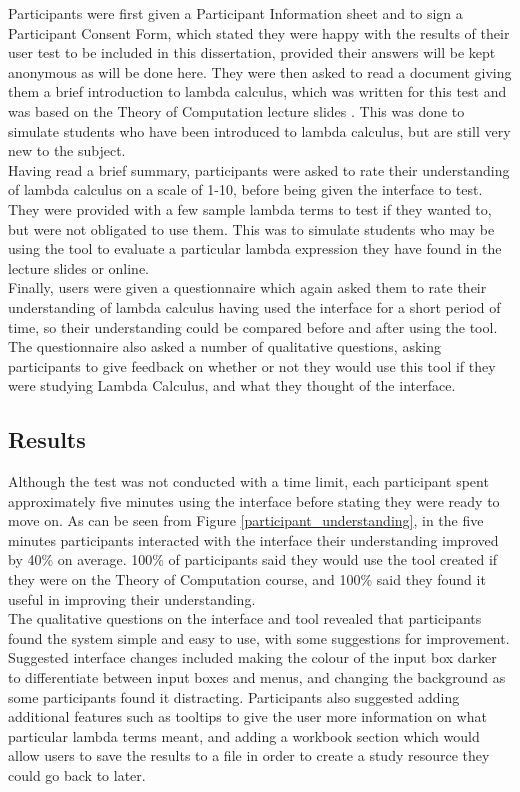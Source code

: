 \documentclass[a4paper,11pt]{report}
\begin{document}
Participants were first given a Participant Information sheet and to sign a Participant Consent Form, which stated they were happy with the results of their user test to be included in this dissertation, provided their answers will be kept anonymous as will be done here. They were then asked to read a document giving them a brief introduction to lambda calculus, which was written for this test and was based on the Theory of Computation lecture slides \cite{Gay2019}. This was done to simulate students who have been introduced to lambda calculus, but are still very new to the subject.\\

Having read a brief summary, participants were asked to rate their understanding of lambda calculus on a scale of 1-10, before being given the interface to test. They were provided with a few sample lambda terms to test if they wanted to, but were not obligated to use them. This was to simulate students who may be using the tool to evaluate a particular lambda expression they have found in the lecture slides or online.\\

Finally, users were given a questionnaire which again asked them to rate their understanding of lambda calculus having used the interface for a short period of time, so their understanding could be compared before and after using the tool. The questionnaire also asked a number of qualitative questions, asking participants to give feedback on whether or not they would use this tool if they were studying Lambda Calculus, and what they thought of the interface.

\subsection{Results}
Although the test was not conducted with a time limit, each participant spent approximately five minutes using the interface before stating they were ready to move on. As can be seen from Figure \ref{participant_understanding}, in the five minutes participants interacted with the interface their understanding improved by 40\% on average. 100\% of participants said they would use the tool created if they were on the Theory of Computation course, and 100\% said they found it useful in improving their understanding.\\

The qualitative questions on the interface and tool revealed that participants found the system simple and easy to use, with some suggestions for improvement. Suggested interface changes included making the colour of the input box darker to differentiate between input boxes and menus, and changing the background as some participants found it distracting. Participants also suggested adding additional features such as tooltips to give the user more information on what particular lambda terms meant, and adding a workbook section which would allow users to save the results to a file in order to create a study resource they could go back to later.\\
\end{document}
